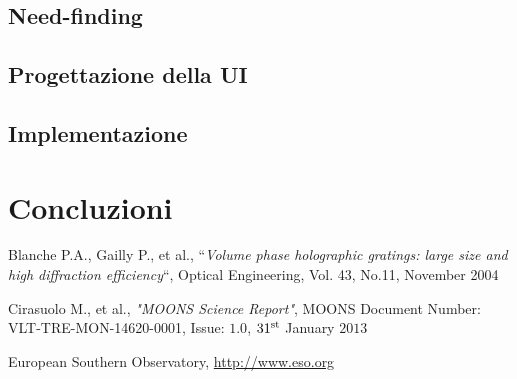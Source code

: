 \documentclass[Lau, oneside]{sapthesis}%
\begin{document}
\section{Need-finding}
\label{sec:nf}
\section{Progettazione della UI}
\label{sec:ui}
\section{Implementazione}
\label{sec:dev}


\chapter{Concluzioni}
\label{ch:4}

\backmatter
{}
\begin{thebibliography}{17}

Blanche P.A., Gailly P., et al., “\textit{Volume phase holographic gratings: large size and high diffraction efficiency}“, Optical Engineering, Vol. 43, No.11, November 2004

Cirasuolo M., et al., \textit{"MOONS Science Report"}, MOONS Document Number: VLT-TRE-MON-14620-0001, Issue: $1.0$, $31^{\textup{st}}$ January $2013$

European Southern Observatory, \url{http://www.eso.org}

\end{thebibliography}
\end{document}
